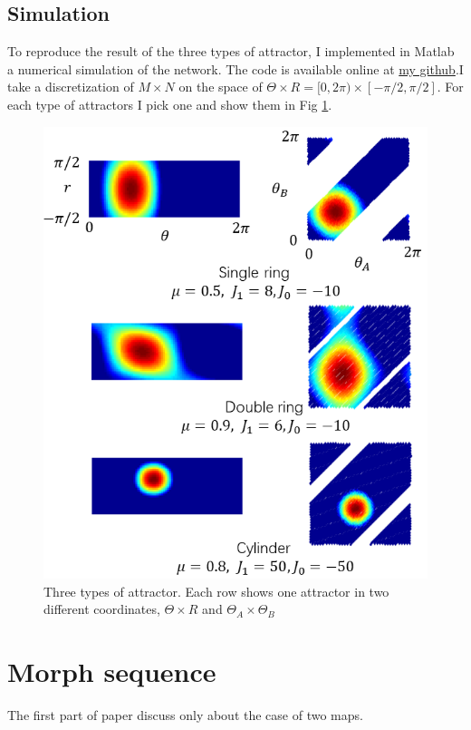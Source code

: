 \documentclass{article}
\begin{document}
	\subsection{Simulation}
	To reproduce the result of the three types of attractor, I implemented in Matlab a numerical simulation of the network. The code is available online at \href{https://github.com/flm8620/Continuous-attractor-network}{my github}.I take a discretization of $M\times N$ on the space of $\Theta\times R = [0,2\pi)\times[-\pi/2,\pi/2]$. For each type of attractors I pick one and show them in Fig \ref{fig:type}.
	
	\begin{figure}[h]
		\centering
		\includegraphics[width=12cm]{figures.png}
		\caption{Three types of attractor. Each row shows one attractor in two different coordinates, $\Theta\times R$ and $\Theta_A\times\Theta_B$}
		\label{fig:type}
	\end{figure}
	

	\section{Morph sequence}
	The first part of paper discuss only about the case of two maps.


\end{document}
